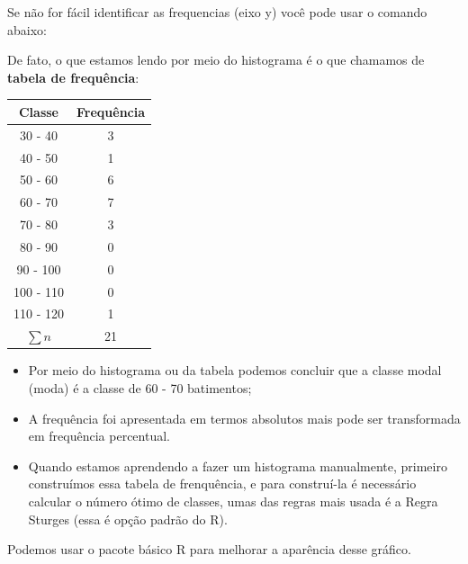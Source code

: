 \documentclass[
]{book}
\newenvironment{Shaded}{\begin{snugshade}}{\end{snugshade}}
\newcommand{\CommentTok}[1]{\textcolor[rgb]{0.56,0.35,0.01}{\textit{#1}}}
\newcommand{\FunctionTok}[1]{\textcolor[rgb]{0.00,0.00,0.00}{#1}}
\newcommand{\NormalTok}[1]{#1}
\newcommand{\SpecialCharTok}[1]{\textcolor[rgb]{0.00,0.00,0.00}{#1}}
\begin{document}
Se não for fácil identificar as frequencias (eixo y) você pode usar o comando abaixo:

\begin{Shaded}
\end{Shaded}

De fato, o que estamos lendo por meio do histograma é o que chamamos de \textbf{tabela de frequência}:

\begin{longtable}[]{@{}cc@{}}
\toprule()
Classe & Frequência \\
\midrule()
\endhead
30 - 40 & 3 \\
40 - 50 & 1 \\
50 - 60 & 6 \\
60 - 70 & 7 \\
70 - 80 & 3 \\
80 - 90 & 0 \\
90 - 100 & 0 \\
100 - 110 & 0 \\
110 - 120 & 1 \\
\(\sum n\) & 21 \\
\bottomrule()
\end{longtable}

\begin{itemize}
\item
  Por meio do histograma ou da tabela podemos concluir que a classe modal (moda) é a classe de 60 - 70 batimentos;
\item
  A frequência foi apresentada em termos absolutos mais pode ser transformada em frequência percentual.
\item
  Quando estamos aprendendo a fazer um histograma manualmente, primeiro construímos essa tabela de frenquência, e para construí-la é necessário calcular o número ótimo de classes, umas das regras mais usada é a Regra Sturges (essa é opção padrão do R).
\end{itemize}

Podemos usar o pacote básico R para melhorar a aparência desse gráfico.
\end{document}

